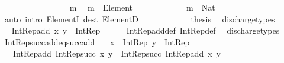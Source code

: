 \begin{isabellebody}
\ \ \isamarkupfalse%
\ {\isacharminus}{\kern0pt}\isanewline
\ \ \ \ \isacommand{{\isacharbraceleft}{\kern0pt}}\isamarkupfalse%
\isanewline
\ \ \ \ \ \ \isamarkupfalse%
\ m\ \isamarkupfalse%
\ {\isachardoublequoteopen}m\ {\isacharcolon}{\kern0pt}\ Element\ {\isacharparenleft}{\kern0pt}{\isasymnat}\ {\isasymsetminus}\ {\isacharbraceleft}{\kern0pt}{}{\isacharbraceright}{\kern0pt}{\isacharparenright}{\kern0pt}{\isachardoublequoteclose}\isanewline
\ \ \ \ \ \ \isamarkupfalse%
\ \isamarkupfalse%
\ {\isachardoublequoteopen}m\ {\isacharcolon}{\kern0pt}\ Nat{\isachardoublequoteclose}\ \isamarkupfalse%
\ {\isacharparenleft}{\kern0pt}auto\ intro{\isacharcolon}{\kern0pt}\ ElementI\ dest{\isacharcolon}{\kern0pt}\ ElementD{\isacharparenright}{\kern0pt}\isanewline
\ \ \ \ \isacommand{{\isacharbraceright}{\kern0pt}}\isamarkupfalse%
\isanewline
\ \ \ \ \isamarkupfalse%
\ \isamarkupfalse%
\ {\isacharquery}{\kern0pt}thesis\ \isamarkupfalse%
\ discharge{\isacharunderscore}{\kern0pt}types\isanewline
\ \ \isamarkupfalse%
\isanewline
\ \ \isamarkupfalse%
\ \isamarkupfalse%
\ {\isachardoublequoteopen}Int{\isacharunderscore}{\kern0pt}Rep{\isacharunderscore}{\kern0pt}add\ x\ y\ {\isacharcolon}{\kern0pt}\ Int{\isacharunderscore}{\kern0pt}Rep{\isachardoublequoteclose}\isanewline
\ \ \ \ \isamarkupfalse%
\ Int{\isacharunderscore}{\kern0pt}Rep{\isacharunderscore}{\kern0pt}add{\isacharunderscore}{\kern0pt}def\ Int{\isacharunderscore}{\kern0pt}Rep{\isacharunderscore}{\kern0pt}def\ \isamarkupfalse%
\ discharge{\isacharunderscore}{\kern0pt}types\isanewline
{}\isamarkupfalse%
%
\endisatagproof
{\isafoldproof}%
%
\isadelimproof
\isanewline
%
\endisadelimproof
\isanewline
{}\isamarkupfalse%
\ Int{\isacharunderscore}{\kern0pt}Rep{\isacharunderscore}{\kern0pt}succ{\isacharunderscore}{\kern0pt}add{\isacharunderscore}{\kern0pt}eq{\isacharunderscore}{\kern0pt}succ{\isacharunderscore}{\kern0pt}add{\isacharcolon}{\kern0pt}\isanewline
\ \ \ {\isachardoublequoteopen}x\ {\isacharcolon}{\kern0pt}\ Int{\isacharunderscore}{\kern0pt}Rep{\isachardoublequoteclose}\ {\isachardoublequoteopen}y\ {\isacharcolon}{\kern0pt}\ Int{\isacharunderscore}{\kern0pt}Rep{\isachardoublequoteclose}\isanewline
\ \ \ {\isachardoublequoteopen}Int{\isacharunderscore}{\kern0pt}Rep{\isacharunderscore}{\kern0pt}add\ {\isacharparenleft}{\kern0pt}Int{\isacharunderscore}{\kern0pt}Rep{\isacharunderscore}{\kern0pt}succ\ x{\isacharparenright}{\kern0pt}\ y\ {\isacharequal}{\kern0pt}\ Int{\isacharunderscore}{\kern0pt}Rep{\isacharunderscore}{\kern0pt}succ\ {\isacharparenleft}{\kern0pt}Int{\isacharunderscore}{\kern0pt}Rep{\isacharunderscore}{\kern0pt}add\ x\ y{\isacharparenright}{\kern0pt}{\isachardoublequoteclose}\isanewline

\end{isabellebody}
